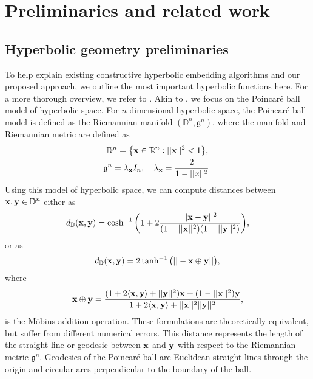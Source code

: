 \section{Preliminaries and related work}
\label{sec:related_work}

\subsection{Hyperbolic geometry preliminaries}
\vspace{-0.1cm}
To help explain existing constructive hyperbolic embedding algorithms and our proposed approach, we outline the most important hyperbolic functions here. For a more thorough overview, we refer to \citep{cannon1997hyperbolic,anderson2005hyperbolic}. Akin to \citep{nickel2017poincare,ganea2018hyperbolic,sala2018representation}, we focus on the Poincaré ball model of hyperbolic space. For $n$-dimensional hyperbolic space, the Poincaré ball model is defined as the Riemannian manifold $(\mathbb{D}^n, \mathfrak{g}^n)$, where the manifold and Riemannian metric are defined as
\begin{equation}
\begin{gathered}
    \mathbb{D}^n = \big\{ \mathbf{x} \in \mathbb{R}^n : ||\mathbf{x}||^2 < 1 \big\},\\
    \mathfrak{g}^n = \lambda_{\mathbf{x}} I_n, \quad \lambda_{\mathbf{x}} = \frac{2}{1 - ||x||^2}.
\end{gathered}
\end{equation}
Using this model of hyperbolic space, we can compute distances between $\mathbf{x}, \mathbf{y} \in \mathbb{D}^n$ either as
\begin{equation}\label{eq:poin_dist_acosh}
    d_{\mathbb{D}} (\mathbf{x}, \mathbf{y}) = \cosh^{-1} \bigg( 1 + 2 \frac{||\mathbf{x} - \mathbf{y}||^2}{(1 - ||\mathbf{x}||^2) (1 - ||\mathbf{y}||^2)} \bigg),
\end{equation}
or as
\begin{equation}\label{eq:poin_dist_atanh}
    d_{\mathbb{D}} (\mathbf{x}, \mathbf{y}) = 2 \tanh^{-1} \big( ||-\mathbf{x} \oplus \mathbf{y}|| \big),
\end{equation}
where
\begin{equation}\label{eq:mob_add}
    \mathbf{x} \oplus \mathbf{y} = \frac{(1 + 2 \langle \mathbf{x}, \mathbf{y} \rangle + ||\mathbf{y}||^2) \mathbf{x} + (1 - ||\mathbf{x}||^2) \mathbf{y}}{1 + 2 \langle \mathbf{x}, \mathbf{y} \rangle + ||\mathbf{x}||^2 ||\mathbf{y}||^2},
\end{equation}
is the Möbius addition operation. These formulations are theoretically equivalent, but suffer from different numerical errors. This distance represents the length of the straight line or geodesic between $\mathbf{x}$ and $\mathbf{y}$ with respect to the Riemannian metric $\mathfrak{g}^n$. Geodesics of the Poincaré ball are Euclidean straight lines through the origin and circular arcs perpendicular to the boundary of the ball.
